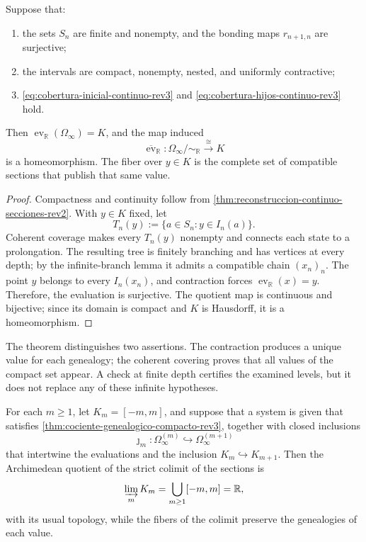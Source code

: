 \begin{theorem}
\label{thm:cociente-genealogico-compacto-rev3}
Suppose that:
\begin{enumerate}
\item the sets \(S_n\) are finite and nonempty, and the bonding maps
      \(r_{n+1,n}\) are surjective;
\item the intervals are compact, nonempty, nested, and uniformly
      contractive;
\item
      \eqref{eq:cobertura-inicial-continuo-rev3} and
      \eqref{eq:cobertura-hijos-continuo-rev3} hold.
\end{enumerate}
Then \(\operatorname{ev}_{\mathbb R}(\Omega_\infty)=K\), and the map
induced
\begin{equation}
 \overline{\operatorname{ev}}_{\mathbb R}:
 \Omega_\infty/\!\sim_{\mathbb R}\xrightarrow{\ \cong\ }K
 \label{eq:homeomorfismo-cociente-continuo-rev3}
\end{equation}
is a homeomorphism. The fiber over \(y\in K\) is the complete set of
compatible sections that publish that same value.
\end{theorem}

\begin{proof}
Compactness and continuity follow from
\cref{thm:reconstruccion-continuo-secciones-rev2}. With \(y\in K\) fixed, let
\[
 T_n(y):=\{a\in S_n:y\in I_n(a)\}.
\]
Coherent coverage makes every \(T_n(y)\) nonempty and connects each
state to a prolongation. The resulting tree is finitely branching and
has vertices at every depth; by the infinite-branch lemma it admits a
compatible chain \((x_n)_n\). The point \(y\) belongs to every
\(I_n(x_n)\), and contraction forces
\(\operatorname{ev}_{\mathbb R}(x)=y\). Therefore, the evaluation is
surjective. The quotient map is continuous and bijective; since its
domain is compact and \(K\) is Hausdorff, it is a homeomorphism.
\end{proof}

The theorem distinguishes two assertions. The contraction produces a unique value
for each genealogy; the coherent covering proves that all values
of the compact set appear. A check at finite depth certifies the
examined levels, but it does not replace any of these infinite hypotheses.

\begin{proposition}
\label{prop:atlas-genealogico-recta-real-rev3}
For each \(m\geq1\), let \(K_m=[-m,m]\), and suppose that a system is given that
satisfies \cref{thm:cociente-genealogico-compacto-rev3}, together with
closed inclusions
\[
 \jmath_m:\Omega_\infty^{(m)}\hookrightarrow\Omega_\infty^{(m+1)}
\]
that intertwine the evaluations and the inclusion
\(K_m\hookrightarrow K_{m+1}\). Then the Archimedean quotient of the
strict colimit of the sections is
\[
 \varinjlim_m K_m=\bigcup_{m\geq1}[-m,m]=\mathbb R,
\]
with its usual topology, while the fibers of the colimit preserve the genealogies of each value.
\end{proposition}

